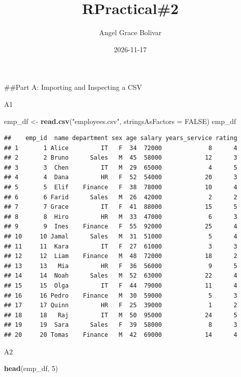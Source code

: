 \documentclass[
]{article}
\title{RPractical\#2}
\author{Angel Grace Bolivar}
\date{2026-11-17}
\newenvironment{Shaded}{\begin{snugshade}}{\end{snugshade}}
\newcommand{\AttributeTok}[1]{\textcolor[rgb]{0.13,0.29,0.53}{#1}}
\newcommand{\ConstantTok}[1]{\textcolor[rgb]{0.56,0.35,0.01}{#1}}
\newcommand{\DecValTok}[1]{\textcolor[rgb]{0.00,0.00,0.81}{#1}}
\newcommand{\FunctionTok}[1]{\textcolor[rgb]{0.13,0.29,0.53}{\textbf{#1}}}
\newcommand{\NormalTok}[1]{#1}
\newcommand{\OtherTok}[1]{\textcolor[rgb]{0.56,0.35,0.01}{#1}}
\newcommand{\StringTok}[1]{\textcolor[rgb]{0.31,0.60,0.02}{#1}}
\begin{document}
\maketitle

\#\#Part A: Importing and Inspecting a CSV

A1

\begin{Shaded}
\begin{Highlighting}[]
\NormalTok{emp\_df }\OtherTok{\textless{}{-}} \FunctionTok{read.csv}\NormalTok{(}\StringTok{"employees.csv"}\NormalTok{, }\AttributeTok{stringsAsFactors =} \ConstantTok{FALSE}\NormalTok{)}
\NormalTok{emp\_df}
\end{Highlighting}
\end{Shaded}

\begin{verbatim}
##    emp_id  name department sex age salary years_service rating
## 1       1 Alice         IT   F  34  72000             8      4
## 2       2 Bruno      Sales   M  45  58000            12      3
## 3       3  Chen         IT   M  29  65000             4      5
## 4       4  Dana         HR   F  52  54000            20      3
## 5       5  Elif    Finance   F  38  78000            10      4
## 6       6 Farid      Sales   M  26  42000             2      2
## 7       7 Grace         IT   F  41  88000            15      5
## 8       8  Hiro         HR   M  33  47000             6      3
## 9       9  Ines    Finance   F  55  92000            25      4
## 10     10 Jamal      Sales   M  31  51000             5      4
## 11     11  Kara         IT   F  27  61000             3      3
## 12     12  Liam    Finance   M  48  72000            18      2
## 13     13   Mia         HR   F  36  56000             9      5
## 14     14  Noah      Sales   M  52  63000            22      4
## 15     15  Olga         IT   F  44  79000            11      4
## 16     16 Pedro    Finance   M  30  59000             5      3
## 17     17 Quinn         HR   F  25  39000             1      2
## 18     18   Raj         IT   M  50  95000            24      5
## 19     19  Sara      Sales   F  39  58000             8      3
## 20     20 Tomas    Finance   M  42  69000            14      4
\end{verbatim}

A2

\begin{Shaded}
\begin{Highlighting}[]
\FunctionTok{head}\NormalTok{(emp\_df, }\DecValTok{5}\NormalTok{)}
\end{Highlighting}
\end{Shaded}
\end{document}
